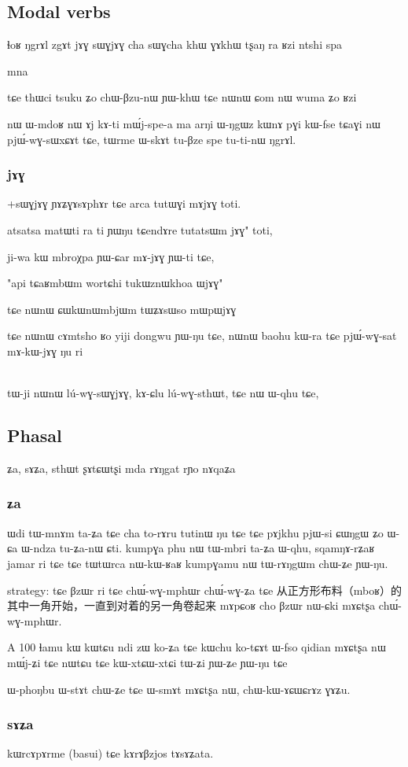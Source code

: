 \documentclass[oldfontcommands,oneside,a4paper,11pt]{article}
\begin{document}
  
  \subsection{Modal verbs}
 ɬoʁ
ŋgrɤl
zgɤt
jɤɣ sɯɣjɤɣ
cha sɯɣcha
khɯ ɣɤkhɯ
tʂaŋ
ra
ʁzi
ntshi
spa

 
mna

tɕe thɯci tsuku ʑo chɯ-βzu-nɯ ɲɯ-khɯ
tɕe nɯnɯ ɕom nɯ wuma ʑo ʁzi

nɯ ɯ-mdoʁ nɯ ɤj kɤ-ti mɯ́j-spe-a ma arŋi ɯ-ŋgɯz kɯnɤ pɣi kɯ-fse
tɕaɣi nɯ pjɯ́-wɣ-sɯxɕɤt tɕe, tɯrme ɯ-skɤt tu-βze spe tu-ti-nɯ ŋgrɤl.


 \subsubsection{jɤɣ}
 +sɯɣjɤɣ
 ɲɤʑɣɤsɤphɤr tɕe arca tutɯɣi mɤjɤɣ toti.

atsatsa matɯti ra ti ɲɯŋu
tɕendɤre tutatsɯm jɤɣ" toti,

ji-wa kɯ mbroχpa ɲɯ-ɕar mɤ-jɤɣ ɲɯ-ti tɕe,

"api tɕaʁmbɯm wortɕhi tukɯznɯkhoa ɯjɤɣ"

tɕe nɯnɯ ɕɯkɯnɯmbjɯm tɯʑɤsɯso mɯpɯjɤɣ

tɕe nɯnɯ cɤmtsho ʁo yiji dongwu ɲɯ-ŋu tɕe, nɯnɯ
baohu kɯ-ra tɕe pjɯ́-wɣ-sat mɤ-kɯ-jɤɣ ŋu ri

\\
tɯ-ji nɯnɯ lú-wɣ-sɯɣjɤɣ, kɤ-ɕlu lú-wɣ-sthɯt, tɕe nɯ ɯ-qhu tɕe,
\subsection{Phasal}
ʑa, sɤʑa, sthɯt ʂɤtɕɯtʂi mda rɤŋgat rɲo
nɤqaʑa
\subsubsection{ʑa}
 ɯdi tɯ-mnɤm ta-ʑa tɕe cha to-rɤru tutinɯ ŋu tɕe
tɕe pɤjkhu pjɯ-si ɕɯŋgɯ ʑo ɯ-ɕa ɯ-ndza tu-ʑa-nɯ ɕti.
kumpɣa phu nɯ tɯ-mbri ta-ʑa ɯ-qhu, 
sqamŋɤ-rʑaʁ jamar ri tɕe tɕe tɯtɯrca nɯ-kɯ-ʁaʁ kumpɣamu nɯ tɯ-rɤŋgɯm chɯ-ʑe ɲɯ-ŋu.

strategy:
tɕe βzɯr ri tɕe chɯ́-wɣ-mphɯr chɯ́-wɣ-ʑa tɕe 从正方形布料（mboʁ）的其中一角开始，一直到对着的另一角卷起来
mɤpɕoʁ cho βzɯr nɯ-ɕki mɤɕtʂa chɯ́-wɣ-mphɯr.

A	100	ɬamu	kɯ	kɯtɕu	ndi	zɯ	ko-ʑa	tɕe	kɯchu	ko-tɕɤt
ɯ-fso qidian mɤɕtʂa nɯ mɯ́j-ʑi
tɕe nɯtɕu tɕe kɯ-xtɕɯ-xtɕi tɯ-ʑi ɲɯ-ʑe ɲɯ-ŋu tɕe

ɯ-phoŋbu ɯ-stɤt chɯ-ʑe tɕe ɯ-smɤt mɤɕtʂa nɯ,
chɯ-kɯ-ɤɕɯɕrɤz ɣɤʑu.
\subsubsection{sɤʑa}
kɯrcɤpɤrme (basui) tɕe kɤrɤβzjos tɤsɤʑata.
\end{document}
